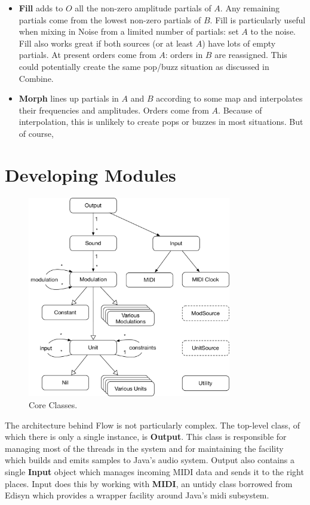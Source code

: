 \documentclass{article}
\newcommand\bump{\vspace{20in}}
\newcommand\name{Flow}
\begin{document}
\begin{itemize}
\item {\bf Fill} adds to \(O\) all the non-zero amplitude partials of \(A\).  Any remaining partials come from the lowest non-zero partials of \(B\).  Fill is particularly useful when mixing in Noise from a limited number of partials: set \(A\) to the noise.  Fill also works great if both sources (or at least \(A\)) have lots of empty partials.  At present orders come from \(A\): orders in \(B\) are reassigned.  This could potentially create the same pop/buzz situation as discussed in Combine.

\item {\bf Morph} lines up partials in \(A\) and \(B\) according to some map and interpolates their frequencies and amplitudes.  Orders come from \(A\).  Because of interpolation, this is unlikely to create pops or buzzes in most situations.  But of course, 



\end{itemize}

\bump
\section{Developing Modules}

\begin{figure}
\vspace{-1em}\includegraphics[width=3.5in]{CoreUML.pdf}
\vspace{-1em}
\caption{Core Classes.}
\vspace{-1em}
\label{hcpanel}
\end{figure}

The architecture behind {\name} is not particularly complex.  The top-level class, of which there is only a single instance, is {\bf Output}. This class is responsible for managing most of the threads in the system and for maintaining the facility which builds and emits samples to Java's audio system.  Output also contains a single {\bf Input} object which manages incoming MIDI data and sends it to the right places.  Input does this by working with {\bf MIDI}, an untidy class borrowed from Edisyn which provides a wrapper facility around Java's midi subsystem.
\end{document}
